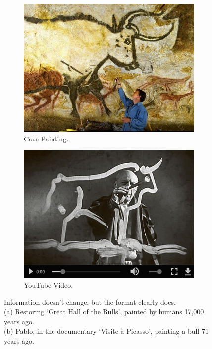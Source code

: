 \begin{figure}[!tbp]
  \begin{subfigure}[b]{0.49\textwidth}
    \includegraphics[width=\textwidth]{graphics/bull_cave.jpg}
    \caption{Cave Painting.}
    \label{fig:cave}
  \end{subfigure}
  \hfill
  \begin{subfigure}[b]{0.49\textwidth}
    \includegraphics[width=\textwidth]{graphics/bull_picasso.jpg}
    \caption{YouTube Video.}
    \label{fig:picasso}
  \end{subfigure}
  \caption{Information doesn't change, but the format clearly does.
  \\(a) Restoring `Great Hall of the Bulls', painted by humans 17,000 years ago.
  \\(b) Pablo, in the documentary `Visite à Picasso', painting a bull 71 years ago.}%
  \label{fig:bull}
\end{figure}

